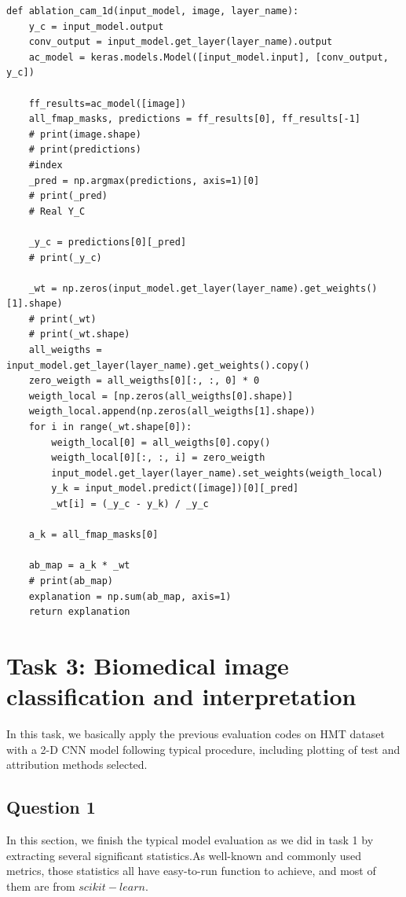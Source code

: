 \documentclass[conference]{IEEEtran}
\begin{document}
\begin{lstlisting}
def ablation_cam_1d(input_model, image, layer_name):
    y_c = input_model.output
    conv_output = input_model.get_layer(layer_name).output
    ac_model = keras.models.Model([input_model.input], [conv_output, y_c])

    ff_results=ac_model([image])
    all_fmap_masks, predictions = ff_results[0], ff_results[-1]
    # print(image.shape)
    # print(predictions)
    #index
    _pred = np.argmax(predictions, axis=1)[0]
    # print(_pred)
    # Real Y_C

    _y_c = predictions[0][_pred]
    # print(_y_c)

    _wt = np.zeros(input_model.get_layer(layer_name).get_weights()[1].shape)
    # print(_wt)
    # print(_wt.shape)
    all_weigths = input_model.get_layer(layer_name).get_weights().copy()
    zero_weigth = all_weigths[0][:, :, 0] * 0
    weigth_local = [np.zeros(all_weigths[0].shape)]
    weigth_local.append(np.zeros(all_weigths[1].shape))
    for i in range(_wt.shape[0]):
        weigth_local[0] = all_weigths[0].copy()
        weigth_local[0][:, :, i] = zero_weigth
        input_model.get_layer(layer_name).set_weights(weigth_local)
        y_k = input_model.predict([image])[0][_pred]
        _wt[i] = (_y_c - y_k) / _y_c

    a_k = all_fmap_masks[0]

    ab_map = a_k * _wt
    # print(ab_map)
    explanation = np.sum(ab_map, axis=1)
    return explanation
\end{lstlisting}

\section{Task 3: Biomedical image classification and interpretation}
In this task, we basically apply the previous evaluation codes on HMT dataset with a 2-D CNN model following typical procedure, including plotting of test and attribution methods selected.
\subsection{Question 1}
In this section, we finish the typical model evaluation as we did in task 1 by extracting several significant statistics.As well-known and commonly used metrics, those statistics all have easy-to-run
function to achieve, and most of them are from $scikit-learn$.
\end{document}
